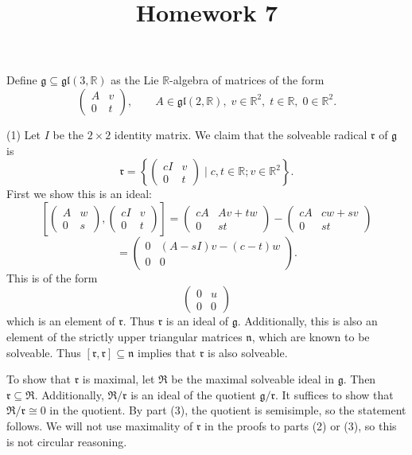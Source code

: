 \documentclass[11pt, letterpaper]{article}
\title{Homework 7}
\theoremstyle{plain}
\begin{document}
\makeproblem

Define $\mathfrak{g} \subseteq \mathfrak{gl}(3,\mathbb{R} )$ as the Lie $\mathbb{R} $-algebra of matrices of the form
\[
	\begin{pmatrix}
	A & v \\
	0 & t
	\end{pmatrix},\qquad A\in \mathfrak{gl} (2,\mathbb{R} ),\; v\in\mathbb{R} ^2, \; t\in\mathbb{R} , \; 0\in\mathbb{R} ^2
.\]

(1) Let $I$ be the $2\times 2$ identity matrix. We claim that the solveable radical $\mathfrak{r} $ of $\mathfrak{g} $ is
\[
	\mathfrak{r} =\left\{ \begin{pmatrix}
	cI & v \\
	0 & t
	\end{pmatrix}\mid c,t\in\mathbb{R} ;v\in\mathbb{R} ^2 \right\} 
.\]
First we show this is an ideal:
\[
	\left[\begin{pmatrix}
	A & w \\
	0 & s
	\end{pmatrix},\begin{pmatrix}
	cI & v \\
	0 & t
\end{pmatrix}\right]=\begin{pmatrix}
cA & Av+tw \\
0 & st
\end{pmatrix}-\begin{pmatrix}
cA & cw+sv \\
0 & st
\end{pmatrix}
\]
\[
	=\begin{pmatrix}
	0 & (A-sI)v-(c-t)w \\
	0 & 0
	\end{pmatrix}
.\]
This is of the form
\[
	\begin{pmatrix}
	0 & u \\
	0 &0
	\end{pmatrix}
\]
which is an element of $\mathfrak{r} $. Thus $\mathfrak{r} $ is an ideal of $\mathfrak{g} $. Additionally, this is also an element of the strictly upper triangular matrices $\mathfrak{n} $, which are known to be solveable. Thus $[\mathfrak{r} ,\mathfrak{r} ]\subseteq \mathfrak{n} $ implies that $\mathfrak{r} $ is also solveable.

To show that $\mathfrak{r} $ is maximal, let $\mathfrak{R} $ be the maximal solveable ideal in $\mathfrak{g} $. Then $\mathfrak{r} \subseteq \mathfrak{R} $. Additionally, $\mathfrak{R} /\mathfrak{r} $ is an ideal of the quotient $\mathfrak{g} /\mathfrak{r} $. It suffices to show that $\mathfrak{R} /\mathfrak{r} \cong 0$ in the quotient. By part (3), the quotient is semisimple, so the statement follows. We will not use maximality of $\mathfrak{r} $ in the proofs to parts (2) or (3), so this is not circular reasoning.
\end{document}
